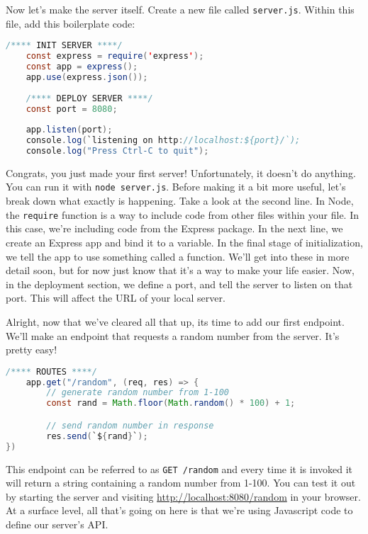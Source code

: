 Now let's make the server itself. Create a new file called \texttt{server.js}. Within this file, add this boilerplate code:

\begin{lstlisting}[language=Java]
    /**** INIT SERVER ****/
    const express = require('express');
    const app = express();
    app.use(express.json());
    
    /**** DEPLOY SERVER ****/
    const port = 8080;
    
    app.listen(port);
    console.log(`listening on http://localhost:${port}/`);
    console.log("Press Ctrl-C to quit");
\end{lstlisting}

Congrats, you just made your first server! Unfortunately, it doesn't do anything. You can run it with \texttt{node server.js}. Before making it a bit more useful, let's break down what exactly is happening. Take a look at the second line. In Node, the \texttt{require} function is a way to include code from other files within your file. In this case, we're including code from the Express package. In the next line, we create an Express app and bind it to a variable. In the final stage of initialization, we tell the app to use something called a  function. We'll get into these in more detail soon, but for now just know that it's a way to make your life easier. Now, in the deployment section, we define a port, and tell the server to listen on that port. This will affect the URL of your local server.

Alright, now that we've cleared all that up, its time to add our first endpoint. We'll make an endpoint that requests a random number from the server. It's pretty easy!

\begin{lstlisting}[language=Java,firstnumber=6]
    /**** ROUTES ****/
    app.get("/random", (req, res) => {
        // generate random number from 1-100
        const rand = Math.floor(Math.random() * 100) + 1;

        // send random number in response
        res.send(`${rand}`);
})
\end{lstlisting}

This endpoint can be referred to as \texttt{GET /random} and every time it is invoked it will return a string containing a random number from 1-100. You can test it out by starting the server and visiting \url{http://localhost:8080/random} in your browser. At a surface level, all that's going on here is that we're using Javascript code to define our server's API. 

